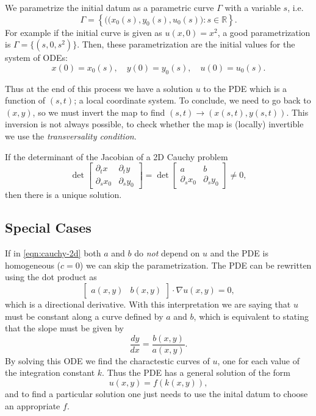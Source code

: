 We parametrize the initial datum as a parametric curve $\Gamma$ with a
variable $s$, i.e.
\[
  \Gamma = \left\{
    \bigr( (x_0(s), y_0(s), u_0(s) \bigl) : s \in \mathbb{R}
  \right\}.
\]
For example if the initial curve is given as $u(x, 0) = x^2$, a good
parametrization is $\Gamma = \{ (s, 0, s^2) \}$. Then, these parametrization
are the initial values for the system of ODEs:
\[
  x(0) = x_0(s), \quad
  y(0) = y_0(s), \quad
  u(0) = u_0(s).
\]

Thus at the end of this process we have a solution $u$ to the PDE which is a
function of $(s, t)$; a local coordinate system. To conclude, we need to go
back to $(x,y)$, so we must invert the map to find $(s, t) \to (x(s,t),
y(s,t))$. This inversion is not always possible, to check whether the map is
(locally) invertible we use the \emph{transversality condition}.
\begin{thm}
  If the determinant of the Jacobian of a 2D Cauchy problem
  \[
    \det\begin{bmatrix}
      \partial_t x & \partial_t y \\
      \partial_s x_0 & \partial_s y_0
    \end{bmatrix}
    =
    \det\begin{bmatrix}
      a & b \\ \partial_s x_0 & \partial_s y_0
    \end{bmatrix}
    \neq 0,
  \]
  then there is a unique solution.
\end{thm}


\subsection{Special Cases}

If in \eqref{eqn:cauchy-2d} both $a$ and $b$ do \emph{not} depend on $u$ and
the PDE is homogeneous ($c = 0$) we can skip the parametrization. The PDE can
be rewritten using the dot product as
\[
  \begin{bmatrix} a(x,y) & b(x,y) \end{bmatrix}
    \cdot \nabla u(x,y) = 0,
\]
which is a directional derivative. With this interpretation we are saying that
$u$ must be constant along a curve defined by $a$ and $b$, which is equivalent
to stating that the slope must be given by
\[
  \frac{dy}{dx} = \frac{b(x,y)}{a(x,y)}.
\]
By solving this ODE we find the charactestic curves of $u$, one for each value
of the integration constant $k$. Thus the PDE has a general solution of the
form
\[
  u(x,y) = f(k(x,y)),
\]
and to find a particular solution one just needs to use the inital datum to
choose an appropriate $f$.
